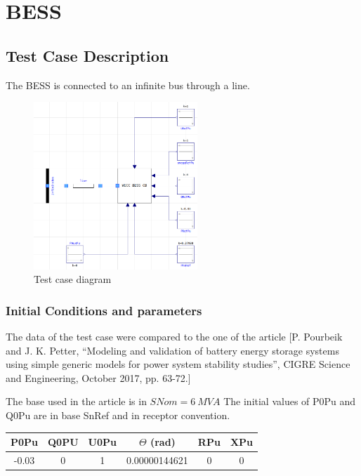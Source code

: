 \documentclass[a4paper, 12pt]{report}
\begin{document}
\section{BESS}

\subsection{Test Case Description}
The BESS is connected to an infinite bus through a line.

\begin{figure}[H]
\center
  \includegraphics[width=0.55\textwidth]{BESS.png}
  \caption{Test case diagram}
\end{figure}


\subsubsection{Initial Conditions and parameters}
The data of the test case were compared to the one of the article
[P. Pourbeik and J. K. Petter, “Modeling and validation of battery energy storage systems
using simple generic models for power system stability studies”, CIGRE Science and
Engineering, October 2017, pp. 63-72.]

The base used in the article is in $SNom =6\ MVA$
The initial values of P0Pu and Q0Pu are in base SnRef and in receptor convention.

\begin{center}
\begin{tabular}{|c|c|c|c|c|c|}
  \hline
 P0Pu & Q0PU & U0Pu & $\Theta$ (rad) & RPu & XPu\\
  \hline
 -0.03 & 0 & 1 & 0.00000144621 & 0 & 0\\
  \hline
\end{tabular}
\end{center}
\end{document}
